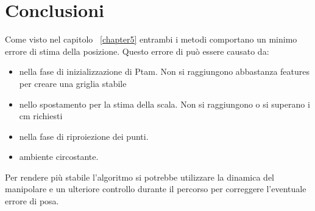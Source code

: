 \chapter{Conclusioni}
\label{chapter6}
Come visto nel capitolo ~\ref{chapter5} entrambi i metodi comportano un minimo errore di stima della posizione. Questo errore di può essere causato da:
\begin{itemize}
\item nella fase di inizializzazione di Ptam. Non si raggiungono abbastanza features per creare una griglia stabile
\item nello spostamento per la stima della scala. Non si raggiungono o si superano i cm richiesti
\item nella fase di riproiezione dei punti.
\item ambiente circostante. 
\end{itemize}
Per rendere più stabile l'algoritmo si potrebbe utilizzare la dinamica del manipolare e un ulteriore controllo durante il percorso per correggere l'eventuale errore di posa.
